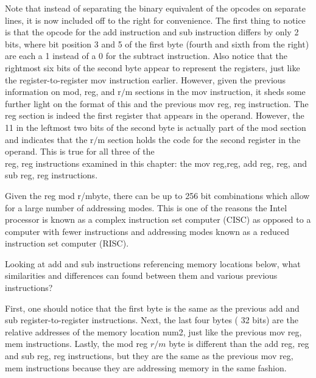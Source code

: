\documentclass[10pt]{article}
\begin{document}
Note that instead of separating the binary equivalent of the opcodes on separate lines, it is now included off to the right for convenience. The first thing to notice is that the opcode for the add instruction and sub instruction differs by only 2 bits, where bit position 3 and 5 of the first byte (fourth and sixth from the right) are each a 1 instead of a 0 for the subtract instruction. Also notice that the rightmost six bits of the second byte appear to represent the registers, just like the register-to-register mov instruction earlier. However, given the previous information on mod, reg, and $\mathrm{r} / \mathrm{m}$ sections in the mov instruction, it sheds some further light on the format of this and the previous mov reg, reg instruction. The reg section is indeed the first register that appears in the operand. However, the 11 in the leftmost two bits of the second byte is actually part of the mod section and indicates that the $\mathrm{r} / \mathrm{m}$ section holds the code for the second register in the operand. This is true for all three of the\\
reg, reg instructions examined in this chapter: the mov reg,reg, add reg, reg, and sub reg, reg instructions.

Given the reg mod r/mbyte, there can be up to 256 bit combinations which allow for a large number of addressing modes. This is one of the reasons the Intel processor is known as a complex instruction set computer (CISC) as opposed to a computer with fewer instructions and addressing modes known as a reduced instruction set computer (RISC).

Looking at add and sub instructions referencing memory locations below, what similarities and differences can found between them and various previous instructions?

First, one should notice that the first byte is the same as the previous add and sub register-to-register instructions. Next, the last four bytes ( 32 bits) are the relative addresses of the memory location num2, just like the previous mov reg, mem instructions. Lastly, the mod reg $r / m$ byte is different than the add reg, reg and sub reg, reg instructions, but they are the same as the previous mov reg, mem instructions because they are addressing memory in the same fashion.
\end{document}
